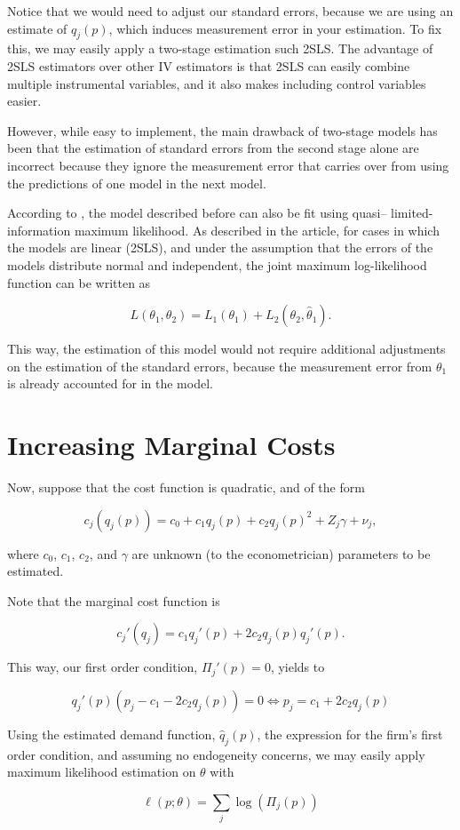 \documentclass[cm,linguex]{glossa}
\theoremstyle{defn}
\theoremstyle{axiom}
\theoremstyle{thm}
\theoremstyle{lem}
\theoremstyle{cor}
\theoremstyle{prop}
\theoremstyle{rmk}
\begin{document}
Notice that we would need to adjust our standard errors, because we are
using an estimate of \(q_j(p)\), which induces measurement error in your
estimation. To fix this, we may easily apply a two-stage estimation such
2SLS. The advantage of 2SLS estimators over other IV estimators is that
2SLS can easily combine multiple instrumental variables, and it also
makes including control variables easier.

However, while easy to implement, the main drawback of two-stage models
has been that the estimation of standard errors from the second stage
alone are incorrect because they ignore the measurement error that
carries over from using the predictions of one model in the next model.

According to \citet{quasi}, the model described before can also be fit
using quasi-- limited-information maximum likelihood. As described in
the article, for cases in which the models are linear (2SLS), and under
the assumption that the errors of the models distribute normal and
independent, the joint maximum log-likelihood function can be written as

\[ L(\theta_1, \theta_2) = L_1(\theta_1) + L_2(\theta_2, \hat{\theta}_1). \]

This way, the estimation of this model would not require additional
adjustments on the estimation of the standard errors, because the
measurement error from \(\theta_1\) is already accounted for in the
model.

\hypertarget{increasing-marginal-costs}{%
\section{Increasing Marginal Costs}\label{increasing-marginal-costs}}

Now, suppose that the cost function is quadratic, and of the form

\[ c_j\left(q_j(p)\right) = c_0 + c_1q_j(p) + c_2q_j(p)^2 + Z_j\gamma + \nu_j , \]

where \(c_0\), \(c_1\), \(c_2\), and \(\gamma\) are unknown (to the
econometrician) parameters to be estimated.

Note that the marginal cost function is

\[ c_j'(q_j) = c_1 q_j'(p) + 2c_2q_j(p)q_j'(p). \]

This way, our first order condition, \(\Pi_j'(p) = 0\), yields to

\[ q_j'(p) (p_j - c_1 - 2c_2q_j(p)) = 0 \iff p_j = c_1 + 2c_2q_j(p) \]

Using the estimated demand function, \(\hat q_j(p)\), the expression for
the firm's first order condition, and assuming no endogeneity concerns,
we may easily apply maximum likelihood estimation on \(\theta\) with

\[ \ell(p; \theta) = \sum_j \log(\Pi_j(p)) \]


\end{document}
